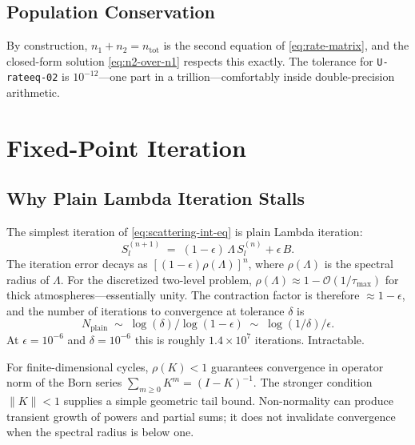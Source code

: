 \documentclass[11pt]{article}
\newcommand{\Lop}{\Lambda}
\begin{document}
\subsection{Population Conservation}

By construction, $n_1 + n_2 = n_{\mathrm{tot}}$ is the second equation
of \eqref{eq:rate-matrix}, and the closed-form solution
\eqref{eq:n2-over-n1} respects this exactly.
The tolerance for \texttt{U-rateeq-02} is $10^{-12}$---one part in a
trillion---comfortably inside double-precision arithmetic.

\section{Fixed-Point Iteration}
\label{sec:fixed-point}

\subsection{Why Plain Lambda Iteration Stalls}
\label{sec:lambda-stall}

The simplest iteration of \eqref{eq:scattering-int-eq} is plain Lambda
iteration:
\begin{equation}
S_l^{(n+1)} \;=\; (1 - \epsilon)\, \Lop\, S_l^{(n)} + \epsilon\, B.
\label{eq:plain-lambda}
\end{equation}
The iteration error decays as $[(1 - \epsilon) \rho(\Lop)]^n$, where
$\rho(\Lop)$ is the spectral radius of $\Lop$.  For the discretized
two-level problem, $\rho(\Lop) \approx 1 - \mathcal{O}(1/\tau_{\max})$
for thick atmospheres---essentially unity.  The contraction factor is
therefore $\approx 1 - \epsilon$, and the number of iterations to
convergence at tolerance $\delta$ is
\begin{equation}
N_{\text{plain}} \;\sim\; \log(\delta) / \log(1 - \epsilon) \;\sim\; \log(1/\delta) / \epsilon.
\end{equation}
At $\epsilon = 10^{-6}$ and $\delta = 10^{-6}$ this is roughly
$1.4 \times 10^7$ iterations.  Intractable.

For finite-dimensional cycles, $\rho(K)<1$ guarantees convergence in
operator norm of the Born series $\sum_{m\ge0}K^m=(I-K)^{-1}$.
The stronger condition $\|K\|<1$ supplies a simple geometric tail bound.
Non-normality can produce transient growth of powers and partial sums;
it does not invalidate convergence when the spectral radius is below one.
\end{document}
